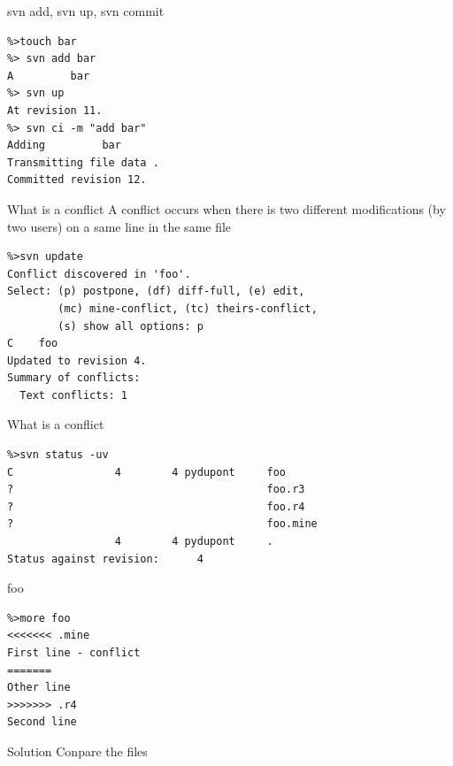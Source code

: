 \documentclass[12pt]{beamer}
\begin{document}
\begin{frame}[fragile]
	\begin{block}{svn add, svn up, svn commit}
		\begin{verbatim}
%>touch bar
%> svn add bar
A         bar
%> svn up
At revision 11.
%> svn ci -m "add bar"
Adding         bar
Transmitting file data .
Committed revision 12.
		\end{verbatim}
	\end{block}
\end{frame}


\begin{frame}[fragile]
	\begin{block}{What is a conflict}
	A conflict occurs when there is two different modifications (by two users) on a same line in the same file
	\end{block}
	\begin{block}{}
	\begin{verbatim}
%>svn update
Conflict discovered in 'foo'.
Select: (p) postpone, (df) diff-full, (e) edit,
        (mc) mine-conflict, (tc) theirs-conflict,
        (s) show all options: p 
C    foo
Updated to revision 4.
Summary of conflicts:
  Text conflicts: 1
		\end{verbatim}
	\end{block}
\end{frame}

\begin{frame}[fragile]
	\begin{block}{What is a conflict}
		\begin{verbatim}
%>svn status -uv
C                4        4 pydupont     foo
?                                        foo.r3
?                                        foo.r4
?                                        foo.mine
                 4        4 pydupont     .
Status against revision:      4
		\end{verbatim}
	\end{block}
	\begin{block}{foo}
		\begin{verbatim}
%>more foo
<<<<<<< .mine
First line - conflict
=======
Other line
>>>>>>> .r4
Second line
		\end{verbatim}
	\end{block}
	\begin{exampleblock}{Solution}
		Conpare the files
	\end{exampleblock}
\end{frame}
\end{document}
